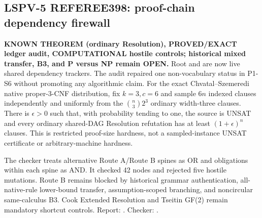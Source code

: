 

\subsection*{LSPV-5 REFEREE398: proof-chain dependency firewall}
\textbf{KNOWN THEOREM (ordinary Resolution), PROVED/EXACT ledger audit,
COMPUTATIONAL hostile controls; historical mixed transfer, B3, and P versus NP
remain OPEN.}
Root  and  are now live shared dependency
trackers.  The audit repaired one non-vocabulary status in P1-S6 without
promoting any algorithmic claim.  For the exact Chvatal--Szemeredi native
proper-3-CNF distribution, fix \(k=3,c=6\) and sample \(6n\) indexed clauses
independently and uniformly from the \(\binom n3 2^3\) ordinary width-three
clauses.  There is \(\epsilon>0\) such that, with probability tending to one,
the source is UNSAT and every ordinary shared-DAG Resolution refutation has at
least \((1+\epsilon)^n\) clauses.  This is restricted proof-size hardness, not
a sampled-instance UNSAT certificate or arbitrary-machine hardness.

The checker treats alternative Route A/Route B spines as OR and obligations
within each spine as AND.  It checked 42 nodes and rejected five hostile
mutations.  Route B remains blocked by historical grammar authentication,
all-native-rule lower-bound transfer, assumption-scoped branching, and
noncircular same-calculus B3.  Cook Extended Resolution and Tseitin GF(2)
remain mandatory shortcut controls.
Report:
.
Checker:
.

